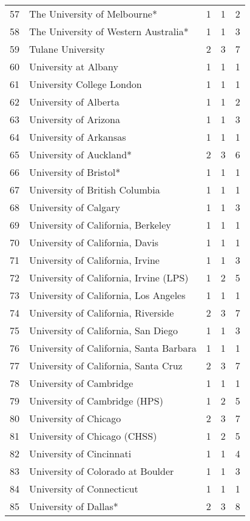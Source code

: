 \begin{table}[ht]
\begin{tabular}{rllll}
  57 & The University of Melbourne* & 1 & 1 & 2 \\ 
  58 & The University of Western Australia* & 1 & 1 & 3 \\ 
  59 & Tulane University & 2 & 3 & 7 \\ 
  60 & University at Albany & 1 & 1 & 1 \\ 
  61 & University College London & 1 & 1 & 1 \\ 
  62 & University of Alberta & 1 & 1 & 2 \\ 
  63 & University of Arizona & 1 & 1 & 3 \\ 
  64 & University of Arkansas & 1 & 1 & 1 \\ 
  65 & University of Auckland* & 2 & 3 & 6 \\ 
  66 & University of Bristol* & 1 & 1 & 1 \\ 
  67 & University of British Columbia & 1 & 1 & 1 \\ 
  68 & University of Calgary & 1 & 1 & 3 \\ 
  69 & University of California, Berkeley & 1 & 1 & 1 \\ 
  70 & University of California, Davis & 1 & 1 & 1 \\ 
  71 & University of California, Irvine & 1 & 1 & 3 \\ 
  72 & University of California, Irvine (LPS) & 1 & 2 & 5 \\ 
  73 & University of California, Los Angeles & 1 & 1 & 1 \\ 
  74 & University of California, Riverside & 2 & 3 & 7 \\ 
  75 & University of California, San Diego & 1 & 1 & 3 \\ 
  76 & University of California, Santa Barbara & 1 & 1 & 1 \\ 
  77 & University of California, Santa Cruz & 2 & 3 & 7 \\ 
  78 & University of Cambridge & 1 & 1 & 1 \\ 
  79 & University of Cambridge (HPS) & 1 & 2 & 5 \\ 
  80 & University of Chicago & 2 & 3 & 7 \\ 
  81 & University of Chicago (CHSS) & 1 & 2 & 5 \\ 
  82 & University of Cincinnati & 1 & 1 & 4 \\ 
  83 & University of Colorado at Boulder & 1 & 1 & 3 \\ 
  84 & University of Connecticut & 1 & 1 & 1 \\ 
  85 & University of Dallas* & 2 & 3 & 8 \\ 

\end{tabular}
\end{table}
